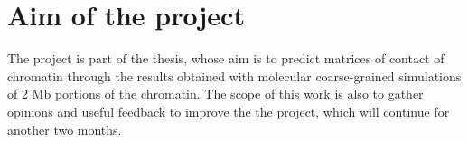 \section{Aim of the project} \label{chap: aim}

The project is part of the thesis, whose aim is to predict matrices of contact of chromatin through the results obtained with molecular coarse-grained simulations of 2 Mb portions of the chromatin.
The scope of this work is also to gather opinions and useful feedback to improve the the project, which will continue for another two months.
